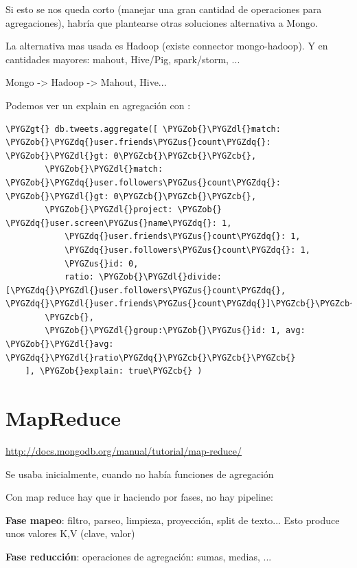 \documentclass[a4paper,10pt,english]{sphinxmanual}
\def\PYGZus{\char`\_}
\def\PYGZob{\char`\{}
\def\PYGZcb{\char`\}}
\def\PYGZgt{\char`\>}
\def\PYGZdl{\char`\$}
\def\PYGZdq{\char`\"}
\begin{document}
Si esto se nos queda corto (manejar una gran cantidad de operaciones para agregaciones),
habría que plantearse otras soluciones alternativa a Mongo.

La alternativa mas usada es Hadoop (existe connector mongo-hadoop). Y en cantidades mayores: mahout, Hive/Pig, spark/storm, ...

Mongo -\textgreater{} Hadoop -\textgreater{} Mahout, Hive...

Podemos ver un explain en agregación con :

\begin{Verbatim}[commandchars=\\\{\}]
\PYGZgt{} db.tweets.aggregate([ \PYGZob{}\PYGZdl{}match: \PYGZob{}\PYGZdq{}user.friends\PYGZus{}count\PYGZdq{}: \PYGZob{}\PYGZdl{}gt: 0\PYGZcb{}\PYGZcb{}\PYGZcb{},
        \PYGZob{}\PYGZdl{}match: \PYGZob{}\PYGZdq{}user.followers\PYGZus{}count\PYGZdq{}: \PYGZob{}\PYGZdl{}gt: 0\PYGZcb{}\PYGZcb{}\PYGZcb{},
        \PYGZob{}\PYGZdl{}project: \PYGZob{} \PYGZdq{}user.screen\PYGZus{}name\PYGZdq{}: 1,
            \PYGZdq{}user.friends\PYGZus{}count\PYGZdq{}: 1,
            \PYGZdq{}user.followers\PYGZus{}count\PYGZdq{}: 1,
            \PYGZus{}id: 0,
            ratio: \PYGZob{}\PYGZdl{}divide:[\PYGZdq{}\PYGZdl{}user.followers\PYGZus{}count\PYGZdq{}, \PYGZdq{}\PYGZdl{}user.friends\PYGZus{}count\PYGZdq{}]\PYGZcb{}\PYGZcb{}
        \PYGZcb{},
        \PYGZob{}\PYGZdl{}group:\PYGZob{}\PYGZus{}id: 1, avg: \PYGZob{}\PYGZdl{}avg: \PYGZdq{}\PYGZdl{}ratio\PYGZdq{}\PYGZcb{}\PYGZcb{}\PYGZcb{}
    ], \PYGZob{}explain: true\PYGZcb{} )
\end{Verbatim}


\section{MapReduce}
\label{contents/aggregationFramework:mapreduce}
\href{http://docs.mongodb.org/manual/tutorial/map-reduce/}{http://docs.mongodb.org/manual/tutorial/map-reduce/}

Se usaba inicialmente, cuando no había funciones de agregación

Con map reduce hay que ir haciendo por fases, no hay pipeline:

\textbf{Fase mapeo}: filtro, parseo, limpieza, proyección, split de texto... Esto produce unos valores K,V (clave, valor)

\textbf{Fase reducción}: operaciones de agregación: sumas, medias, ...
\end{document}
